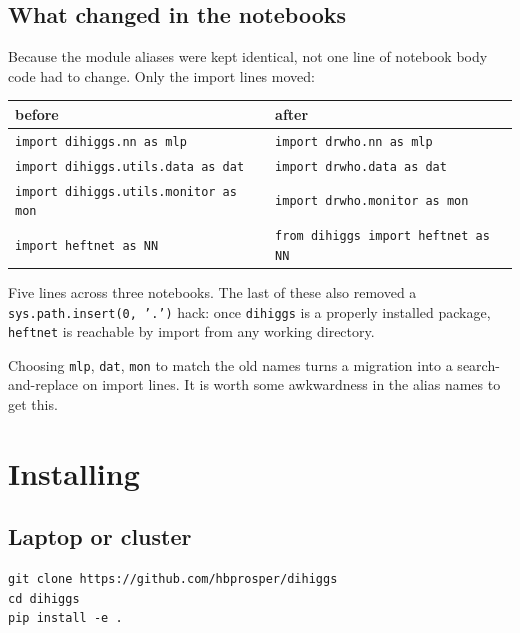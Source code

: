 \documentclass[11pt,a4paper]{article}
\newcommand{\pkg}[1]{\texttt{#1}}
\begin{document}
\subsection{What changed in the notebooks}

Because the module aliases were kept identical, not one line of notebook body
code had to change. Only the import lines moved:

\begin{center}
\small
\begin{tabular}{ll}
\toprule
before & after \\
\midrule
\texttt{import dihiggs.nn as mlp}            & \texttt{import drwho.nn as mlp} \\
\texttt{import dihiggs.utils.data as dat}    & \texttt{import drwho.data as dat} \\
\texttt{import dihiggs.utils.monitor as mon} & \texttt{import drwho.monitor as mon} \\
\texttt{import heftnet as NN}                & \texttt{from dihiggs import heftnet as NN} \\
\bottomrule
\end{tabular}
\end{center}

Five lines across three notebooks. The last of these also removed a
\texttt{sys.path.insert(0, '.')} hack: once \pkg{dihiggs} is a properly installed
package, \texttt{heftnet} is reachable by import from any working directory.

\begin{notebox}
Choosing \texttt{mlp}, \texttt{dat}, \texttt{mon} to match the old names turns a
migration into a search-and-replace on import lines. It is worth some awkwardness
in the alias names to get this.
\end{notebox}

\section{Installing}

\subsection{Laptop or cluster}

\begin{lstlisting}[style=sh]
git clone https://github.com/hbprosper/dihiggs
cd dihiggs
pip install -e .
\end{lstlisting}
\end{document}
